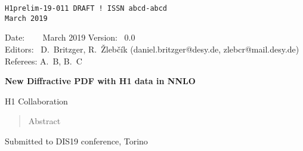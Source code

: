 \documentclass[12pt]{article}
\begin{document}
\begin{titlepage}
\noindent
\begin{flushleft}
{\tt H1prelim-19-011 DRAFT ! \hfill    ISSN abcd-abcd} \\
{\tt March 2019}                  \\
\end{flushleft}

\noindent
Date:   ~   \ \ March 2019 %
Version:~   0.0 \\
Editors:~   D.~Britzger, R.~\v{Z}leb\v{c}\'{i}k (daniel.britzger@desy.de, zlebcr@mail.desy.de) \\
Referees:  A.~B, B.~C \\
\noindent

\vspace{1cm}
\begin{center}
\begin{Large}

{\bf
  New Diffractive PDF with H1 data in NNLO
}

\vspace{1.5cm}

H1 Collaboration%

\end{Large}
\end{center}

\vspace{1.5cm}


\begin{abstract}
\noindent
Abstract
\noindent
\end{abstract}


\begin{center} Submitted to DIS19 conference, Torino \end{center}

\end{titlepage}





\clearpage

\pagestyle{plain} %
\end{document}
